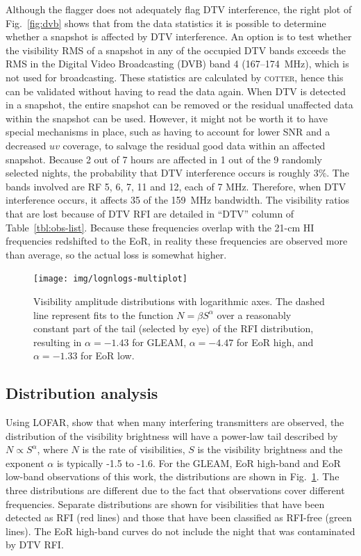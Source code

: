 \documentclass{pasa}
\begin{document}
Although the flagger does not adequately flag DTV interference, the right plot of Fig.~\ref{fig:dvb} shows that from the data statistics it is possible to determine whether a snapshot is affected by DTV interference. An option is to test whether the visibility RMS of a snapshot in any of the occupied DTV bands exceeds the RMS in the Digital Video Broadcasting (DVB) band 4 (167--174~MHz), which is not used for broadcasting. These statistics are calculated by \textsc{cotter}, hence this can be validated without having to read the data again. When DTV is detected in a snapshot, the entire snapshot can be removed or the residual unaffected data within the snapshot can be used. However, it might not be worth it to have special mechanisms in place, such as having to account for lower SNR and a decreased $uv$ coverage, to salvage the residual good data within an affected snapshot. Because 2 out of 7 hours are affected in 1 out of the 9 randomly selected nights, the probability that DTV interference occurs is roughly 3\%. The bands involved are RF 5, 6, 7, 11 and 12, each of 7 MHz. Therefore, when DTV interference occurs, it affects 35 of the 159~MHz bandwidth. The visibility ratios that are lost because of DTV RFI are detailed in ``DTV'' column of Table~\ref{tbl:obs-list}. Because these frequencies overlap with the 21-cm HI frequencies redshifted to the EoR, in reality these frequencies are observed more than average, so the actual loss is somewhat higher.

\noindent\begin{figure}
\begin{center}\hspace*{-0.2cm}\texttt{[image: img/lognlogs-multiplot]}
\caption{Visibility amplitude distributions with logarithmic axes. The dashed line represent fits to the function $N=\beta S^\alpha$ over a reasonably constant part of the tail (selected by eye) of the RFI distribution, resulting in $\alpha=-1.43$ for GLEAM, $\alpha=-4.47$ for EoR high, and $\alpha=-1.33$ for EoR low.}
\label{fig:lognlogs}
\end{center}
\end{figure}

\subsection{Distribution analysis}
Using LOFAR, \citet{offringa-rfi-distributions} show that when many interfering transmitters are observed, the distribution of the visibility brightness will have a power-law tail described by $N\propto S^\alpha$, where $N$ is the rate of visibilities, $S$ is the visibility brightness and the exponent $\alpha$ is typically -1.5 to -1.6. For the GLEAM, EoR high-band and EoR low-band observations of this work, the distributions are shown in Fig.~\ref{fig:lognlogs}. The three distributions are different due to the fact that observations cover different frequencies.  Separate distributions are shown for visibilities that have been detected as RFI (red lines) and those that have been classified as RFI-free (green lines). The EoR high-band curves do not include the night that was contaminated by DTV RFI.
\end{document}
